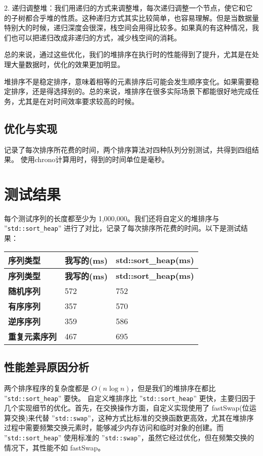 \documentclass{article}
\begin{document}
2. 递归调整堆：我们用递归的方式来调整堆，每次递归调整一个节点，使它和它的子树都合乎堆的性质。这种递归方式其实比较简单，也容易理解。但是当数据量特别大的时候，递归深度会很深，栈空间会用得比较多。如果真的有这种情况，我们也可以把递归改成非递归的方式，减少栈空间的消耗。

总的来说，通过这些优化，我们的堆排序在执行时的性能得到了提升，尤其是在处理大量数据时，优化的效果更加明显。

堆排序不是稳定排序，意味着相等的元素排序后可能会发生顺序变化。如果需要稳定排序，还是得选择别的。总的来说，堆排序在很多实际场景下都能很好地完成任务，尤其是在对时间效率要求较高的时候。

\subsection{优化与实现}
记录了每次排序所花费的时间，两个排序算法对四种队列分别测试，共得到四组结果。
使用chrono计算用时，得到的时间单位是毫秒。
\section{测试结果}

每个测试序列的长度都至少为 1,000,000。我们还将自定义的堆排序与 ''\texttt{std::sort\_heap}'' 进行了对比，记录了每次排序所花费的时间。以下是测试结果：

\begin{longtable}{|l|l|l|}
\hline
\textbf{序列类型} & \textbf{我写的(ms)} & \textbf{std::sort\_heap(ms)} \\
\hline
\endfirsthead
\hline
\textbf{序列类型} & \textbf{我写的(ms)} & \textbf{std::sort\_heap(ms)} \\
\hline
\endhead
\hline
\textbf{随机序列} & 572 & 752 \\
\textbf{有序序列} & 357 & 570 \\
\textbf{逆序序列} & 359 & 586 \\
\textbf{重复元素序列} & 467 & 695 \\
\hline
\end{longtable}

\subsection{性能差异原因分析}

两个排序程序的复杂度都是 $O(n \log n)$，但是我们的堆排序在都比 ''\texttt{std::sort\_heap}'' 要快。
自定义堆排序比 ''\texttt{std::sort\_heap}'' 更快，主要归因于几个实现细节的优化。首先，在交换操作方面，自定义实现使用了 fastSwap(位运算交换)来代替 ''\texttt{std::swap}''，这种方式比标准的交换函数更高效，尤其在堆排序过程中需要频繁交换元素时，能够减少内存访问和临时对象的创建。而 ''\texttt{std::sort\_heap}'' 使用标准的 ''\texttt{std::swap}''，虽然它经过优化，但在频繁交换的情况下，其性能不如 fastSwap。
\end{document}
